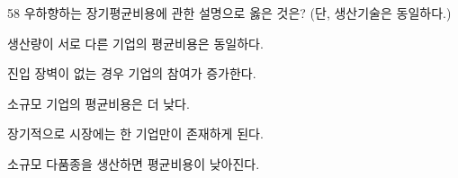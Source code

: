 \begin{question}{58}
우하향하는 장기평균비용에 관한 설명으로 옳은 것은? (단, 생산기술은 동일하다.)
\begin{choices}
  \item 생산량이 서로 다른 기업의 평균비용은 동일하다.
  \item 진입 장벽이 없는 경우 기업의 참여가 증가한다.
  \item 소규모 기업의 평균비용은 더 낮다.
  \item 장기적으로 시장에는 한 기업만이 존재하게 된다.
  \item 소규모 다품종을 생산하면 평균비용이 낮아진다.
\end{choices}
\end{question}
